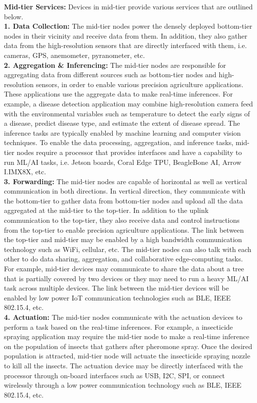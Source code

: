 \noindent\textbf{Mid-tier Services:}
Devices in mid-tier provide various services that are outlined below.
\\\textbf{1. Data Collection:} The mid-tier nodes power the densely deployed bottom-tier nodes in their vicinity and receive data from them. In addition, they also gather data from the high-resolution sensors that are directly interfaced with them, i.e. cameras, GPS, anemometer, pyranometer, etc. 
\\\textbf{2. Aggregation \& Inferencing:} The mid-tier nodes are responsible for aggregating data from different sources such as bottom-tier nodes and high-resolution sensors, in order to enable various precision agriculture applications. These applications use the aggregate data to make real-time inferences. For example, a disease detection application may combine high-resolution camera feed with the environmental variables such as temperature to detect the early signs of a disease, predict disease type, and estimate the extent of disease spread. The inference tasks are typically enabled by machine learning and computer vision techniques. To enable the data processing, aggregation, and inference tasks, mid-tier nodes require a processor that provides interfaces and have a capability to run ML/AI tasks, i.e. Jetson boards, Coral Edge TPU, BeagleBone AI, Arrow I.IMX8X, etc. 
\\\textbf{3. Forwarding:} The mid-tier nodes are capable of horizontal as well as vertical communication in both directions. In vertical direction, they communicate with the bottom-tier to gather data from bottom-tier nodes and upload all the data aggregated at the mid-tier to the top-tier. In addition to the uplink communication to the top-tier, they also receive data and control instructions from the top-tier to enable precision agriculture applications. The link between the top-tier and mid-tier may be enabled by a high bandwidth communication technology such as WiFi, cellular, etc. The mid-tier nodes can also talk with each other to do data sharing, aggregation, and collaborative edge-computing tasks. For example, mid-tier devices may communicate to share the data about a tree that is partially covered by two devices or they may need to run a heavy ML/AI task across multiple devices. The link between the mid-tier devices will be enabled by low power IoT communication technologies such as BLE, IEEE 802.15.4, etc. 
\\\textbf{4. Actuation:} The mid-tier nodes communicate with the actuation devices to perform a task based on the real-time inferences. For example, a insecticide spraying application may require the mid-tier node to make a real-time inference on the population of insects that gathers after pheromone spray. Once the desired population is attracted, mid-tier node will actuate the insecticide spraying nozzle to kill all the insects. The actuation device may be directly interfaced with the processor through on-board interfaces such as USB, I2C, SPI, or connect wirelessly through a low power communication technology such as BLE, IEEE 802.15.4, etc. 
